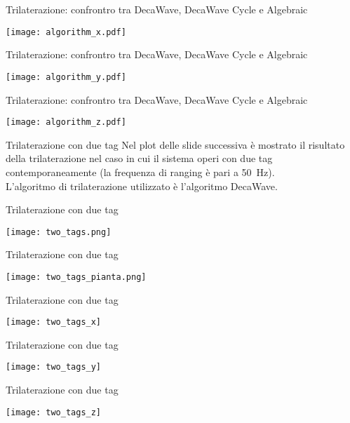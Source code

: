 \begin{frame}{Trilaterazione: confrontro tra DecaWave, DecaWave Cycle e Algebraic}
  \begin{center}
    \texttt{[image: algorithm\_x.pdf]}
  \end{center}
\end{frame}

\begin{frame}{Trilaterazione: confrontro tra DecaWave, DecaWave Cycle e Algebraic}
  \begin{center}
    \texttt{[image: algorithm\_y.pdf]}
  \end{center}
\end{frame}

\begin{frame}{Trilaterazione: confrontro tra DecaWave, DecaWave Cycle e Algebraic}
  \begin{center}
    \texttt{[image: algorithm\_z.pdf]}
  \end{center}
\end{frame}

\begin{frame}{Trilaterazione con due tag}
  Nel plot delle slide successiva è mostrato il risultato della trilaterazione nel caso in cui il sistema
  operi con due tag contemporaneamente (la frequenza di ranging è pari a \SI{50}{\hertz}).\\
  L'algoritmo di trilaterazione utilizzato è l'algoritmo DecaWave.
\end{frame}

\begin{frame}{Trilaterazione con due tag}
  \begin{center}
    \texttt{[image: two\_tags.png]}
  \end{center}
\end{frame}

\begin{frame}{Trilaterazione con due tag}
  \begin{center}
    \texttt{[image: two\_tags\_pianta.png]}
  \end{center}
\end{frame}

\begin{frame}{Trilaterazione con due tag}
  \begin{center}
    \texttt{[image: two\_tags\_x]}
  \end{center}
\end{frame}

\begin{frame}{Trilaterazione con due tag}
  \begin{center}
    \texttt{[image: two\_tags\_y]}
  \end{center}
\end{frame}

\begin{frame}{Trilaterazione con due tag}
  \begin{center}
    \texttt{[image: two\_tags\_z]}
  \end{center}
\end{frame}


